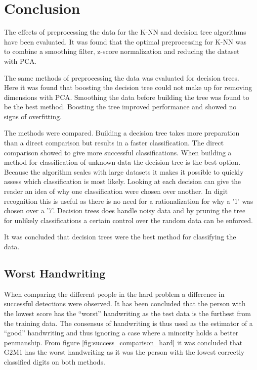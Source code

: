 \section{Conclusion}

The effects of preprocessing the data for the K-NN and decision tree algorithms have been evaluated.
It was found that the optimal preprocessing for K-NN was to combine a smoothing filter, z-score normalization and reducing the dataset with PCA.

The same methods of preprocessing the data was evaluated for decision trees. 
Here it was found that boosting the decision tree could not make up for removing dimensions with PCA.
Smoothing the data before building the tree was found to be the best method.
Boosting the tree improved performance and showed no signs of overfitting.

The methods were compared. 
Building a decision tree takes more preparation than a direct comparison but results in a faster classification.
The direct comparison showed to give more successful classifications.
When building a method for classification of unknown data the decision tree is the best option.
Because the algorithm scales with large datasets it makes it possible to quickly assess which classification is most likely.
Looking at each decision can give the reader an idea of why one classification were chosen over another.
In digit recognition this is useful as there is no need for a rationalization for why a '1' was chosen over a '7'. 
Decision trees does handle noisy data and by pruning the tree for unlikely classifications a certain control over the random data can be enforced.

It was concluded that decision trees were the best method for classifying the data. 

\subsection{Worst Handwriting}

When comparing the different people in the hard problem a difference in successful detections were observed.
It has been concluded that the person with the lowest score has the ``worst'' handwriting as the test data is the furthest from the training data.
The consensus of handwriting is thus used as the estimator of a ``good'' handwriting and thus ignoring a case where a minority holds a better penmanship.
From figure \ref{fig:success_comparison_hard} it was concluded that 
G2M1
has the worst handwriting as it was the person with the lowest correctly classified digits on both methods.
